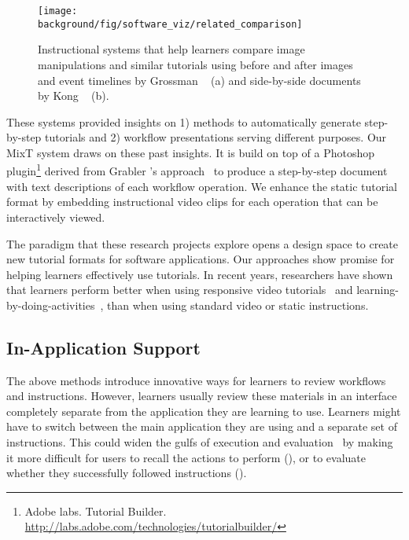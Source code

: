 \begin{figure*}[t!]
  \centering
  \texttt{[image: \\background/fig/software\_viz/related\_comparison]}
  \caption{Instructional systems that help learners compare image manipulations and similar tutorials using before and after images and event timelines by Grossman \ea{}~\cite{Grossman:2010jz} (a) and side-by-side documents by Kong \ea{}~\cite{Kong:2012:DTR:2207676.2208549} (b).}
  \label{fig:related_comparison}
\end{figure*}

These systems provided insights on 1) methods to automatically generate step-by-step tutorials and 2) workflow presentations serving different purposes.
%
Our MixT system draws on these past insights. It is build on top of a Photoshop plugin\footnote{Adobe labs. Tutorial Builder. \url{http://labs.adobe.com/technologies/tutorialbuilder/}} derived from Grabler \ea{}'s approach~\cite{Grabler:2009jj} to produce a step-by-step document with text descriptions of each workflow operation. We enhance the static tutorial format by embedding instructional video clips for each operation that can be interactively viewed.

The paradigm that these research projects explore opens a design space to create new tutorial formats for software applications. Our approaches show promise for helping learners effectively use tutorials. In recent years, researchers have shown that learners perform better when using responsive video tutorials~\cite{Nguyen:2015:MST:2702123.2702209} and learning-by-doing-activities~\cite{Kwon:2016:CEO:2858036.2858101}, than when using standard video or static instructions.


\subsection{In-Application Support}

The above methods introduce innovative ways for learners to review workflows and instructions. However, learners usually review these materials in an interface completely separate from the application they are learning to use. Learners might have to switch between the main application they are using and a separate set of instructions. This could widen the gulfs of execution and evaluation~\cite{Hutchins:1985:DMI:1453233.1453235} by making it more difficult for users to recall the actions to perform (), or to evaluate whether they successfully followed instructions ().

